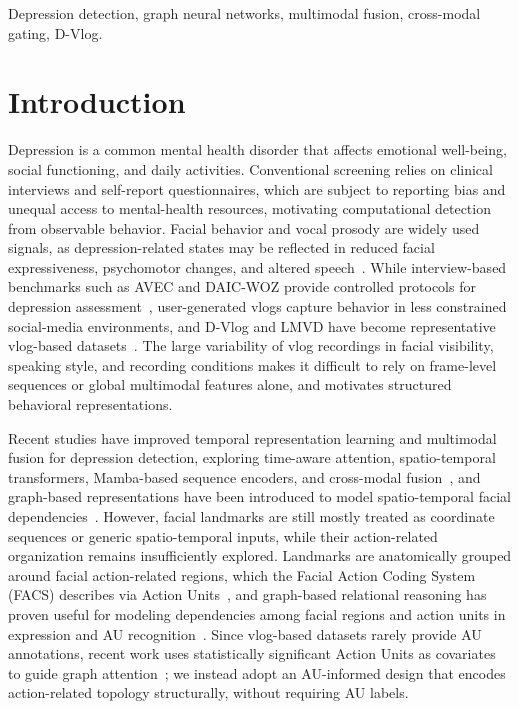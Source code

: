 \documentclass[conference]{IEEEtran}
\begin{document}
\begin{IEEEkeywords}
Depression detection, graph neural networks, multimodal fusion, cross-modal gating, D-Vlog.
\end{IEEEkeywords}

\section{Introduction}
\label{sec:intro}
Depression is a common mental health disorder that affects emotional well-being, social functioning, and daily activities. Conventional screening relies on clinical interviews and self-report questionnaires, which are subject to reporting bias and unequal access to mental-health resources, motivating computational detection from observable behavior. Facial behavior and vocal prosody are widely used signals, as depression-related states may be reflected in reduced facial expressiveness, psychomotor changes, and altered speech~\cite{cohn2009detecting,cummins2015review,yang2013vocal}. While interview-based benchmarks such as AVEC and DAIC-WOZ provide controlled protocols for depression assessment~\cite{valstar2014avec,gratch2014daic}, user-generated vlogs capture behavior in less constrained social-media environments, and D-Vlog and LMVD have become representative vlog-based datasets~\cite{yoon2022dvlog,he2024lmvd}. The large variability of vlog recordings in facial visibility, speaking style, and recording conditions makes it difficult to rely on frame-level sequences or global multimodal features alone, and motivates structured behavioral representations.

Recent studies have improved temporal representation learning and multimodal fusion for depression detection, exploring time-aware attention, spatio-temporal transformers, Mamba-based sequence encoders, and cross-modal fusion~\cite{model:TAMFN,tao2024depmstat,xing2024emomamba,liu2024mddmamba}, and graph-based representations have been introduced to model spatio-temporal facial dependencies~\cite{model:MSI-Net}. However, facial landmarks are still mostly treated as coordinate sequences or generic spatio-temporal inputs, while their action-related organization remains insufficiently explored. Landmarks are anatomically grouped around facial action-related regions, which the Facial Action Coding System (FACS) describes via Action Units~\cite{ekman1978facs,baltrusaitis2018openface}, and graph-based relational reasoning has proven useful for modeling dependencies among facial regions and action units in expression and AU recognition~\cite{song2021uncertain,liao2022fergcn}. Since vlog-based datasets rarely provide AU annotations, recent work uses statistically significant Action Units as covariates to guide graph attention~\cite{zhao2026covariate}; we instead adopt an AU-informed design that encodes action-related topology structurally, without requiring AU labels.
\end{document}
